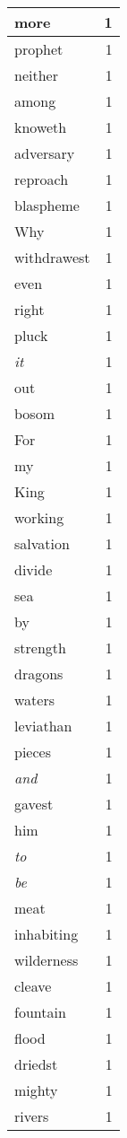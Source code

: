 \begin{center}
\begin{longtable}{l|r}
more & 1 \\ \hline
prophet & 1 \\ \hline
neither & 1 \\ \hline
among & 1 \\ \hline
knoweth & 1 \\ \hline
adversary & 1 \\ \hline
reproach & 1 \\ \hline
blaspheme & 1 \\ \hline
Why & 1 \\ \hline
withdrawest & 1 \\ \hline
even & 1 \\ \hline
right & 1 \\ \hline
pluck & 1 \\ \hline
\emph{it} & 1 \\ \hline
out & 1 \\ \hline
bosom & 1 \\ \hline
For & 1 \\ \hline
my & 1 \\ \hline
King & 1 \\ \hline
working & 1 \\ \hline
salvation & 1 \\ \hline
divide & 1 \\ \hline
sea & 1 \\ \hline
by & 1 \\ \hline
strength & 1 \\ \hline
dragons & 1 \\ \hline
waters & 1 \\ \hline
leviathan & 1 \\ \hline
pieces & 1 \\ \hline
\emph{and} & 1 \\ \hline
gavest & 1 \\ \hline
him & 1 \\ \hline
\emph{to} & 1 \\ \hline
\emph{be} & 1 \\ \hline
meat & 1 \\ \hline
inhabiting & 1 \\ \hline
wilderness & 1 \\ \hline
cleave & 1 \\ \hline
fountain & 1 \\ \hline
flood & 1 \\ \hline
driedst & 1 \\ \hline
mighty & 1 \\ \hline
rivers & 1 \\ \hline

\end{longtable}
\end{center}
